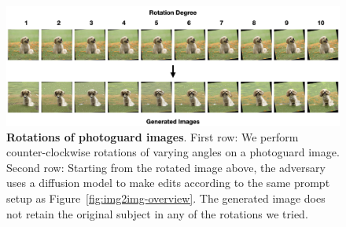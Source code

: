 \begin{figure}[h]
\begin{center}
\includegraphics[width=\textwidth]{images/rotation-figure.001.png}
\end{center}
\caption{\textbf{Rotations of photoguard images}. First row: We perform counter-clockwise rotations of varying angles on a photoguard image. Second row: Starting from the rotated image above, the adversary uses a diffusion model to make edits according to the same prompt setup as Figure~\ref{fig:img2img-overview}. The generated image does not retain the original subject in any of the rotations we tried.}
\label{figure-rotation}
\end{figure}